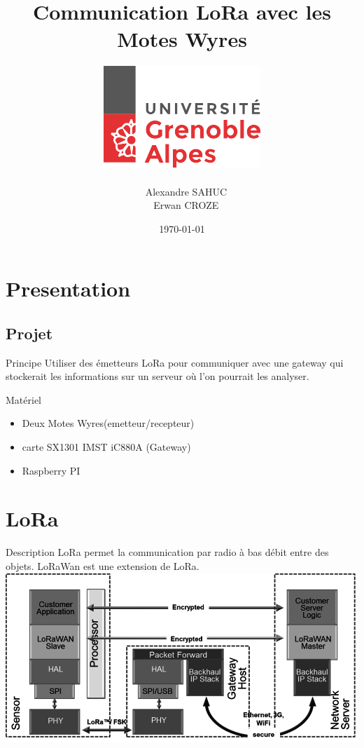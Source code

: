 \documentclass{beamer}
\title{Communication LoRa avec les Motes Wyres}
\author{\includegraphics[scale=0.3]{univ.png} \\~ \\ ~ Alexandre SAHUC\\~ Erwan CROZE}
\institute{Université Joseph Fourier \newline M2M}
\date{\today}
\begin{document}
\begin{frame}
	\titlepage
\end{frame}

\section{Presentation}
\subsection{Projet}
\begin{frame}
  	\begin{block}{Principe}
  		Utiliser des émetteurs LoRa pour communiquer avec une gateway qui stockerait les informations sur un serveur où l'on pourrait les analyser.
	\end{block}
	
	\begin{exampleblock}{Matériel}
		\begin{itemize}
			\item Deux Motes Wyres(emetteur/recepteur)
			\item carte SX1301 IMST iC880A (Gateway)
			\item Raspberry PI 
		\end{itemize}			
	\end{exampleblock}
\end{frame}

\section{LoRa}
\begin{frame}
	\begin{block}{Description}
		LoRa permet la communication par radio à bas débit entre des objets.
		LoRaWan est une extension de LoRa.
		\center
		\includegraphics[scale=0.5]{LoRa-network.png}
	\end{block}
\end{frame}
\end{document}

